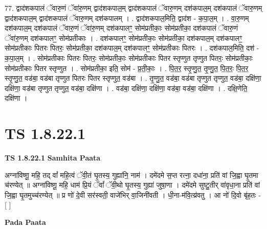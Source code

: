\documentclass[17pt]{extarticle}
\begin{document}
77. द्वाद॑शकपालं ॅवारु॒णं ॅवा॑रु॒णम् द्वाद॑शकपाल॒म् द्वाद॑शकपालं ॅवारु॒णम् दश॑कपाल॒म् दश॑कपालं ॅवारु॒णम् द्वाद॑शकपाल॒म् द्वाद॑शकपालं ॅवारु॒णम् दश॑कपालम् । . द्वाद॑शकपाल॒मिति॒ द्वाद॑श - क॒पा॒ल॒म् । . वा॒रु॒णम् दश॑कपाल॒म् दश॑कपालं ॅवारु॒णं ॅवा॑रु॒णम् दश॑कपालꣳ॒॒ सोम॑प्रतीकाः॒ सोम॑प्रतीका॒ दश॑कपालं ॅवारु॒णं ॅवा॑रु॒णम् दश॑कपालꣳ॒॒ सोम॑प्रतीकाः । . दश॑कपालꣳ॒॒ सोम॑प्रतीकाः॒ सोम॑प्रतीका॒ दश॑कपाल॒म् दश॑कपालꣳ॒॒ सोम॑प्रतीकाः पितरः पितरः॒ सोम॑प्रतीका॒ दश॑कपाल॒म् दश॑कपालꣳ॒॒ सोम॑प्रतीकाः पितरः । . दश॑कपाल॒मिति॒ दश॑ - क॒पा॒ल॒म् । . सोम॑प्रतीकाः पितरः पितरः॒ सोम॑प्रतीकाः॒ सोम॑प्रतीकाः पितर स्तृप्णुत तृप्णुत पितरः॒ सोम॑प्रतीकाः॒ सोम॑प्रतीकाः पितर स्तृप्णुत । . सोम॑प्रतीका॒ इति॒ सोम॑ - प्र॒ती॒काः॒ । . पि॒त॒र॒ स्तृ॒प्णु॒त॒ तृ॒प्णु॒त॒ पि॒त॒रः॒ पि॒त॒र॒ स्तृ॒प्णु॒त॒ वड॑बा॒ वड॑बा तृप्णुत पितरः पितर स्तृप्णुत॒ वड॑बा । . तृ॒प्णु॒त॒ वड॑बा॒ वड॑बा तृप्णुत तृप्णुत॒ वड॑बा॒ दक्षि॑णा॒ दक्षि॑णा॒ वड॑बा तृप्णुत तृप्णुत॒ वड॑बा॒ दक्षि॑णा । . वड॑बा॒ दक्षि॑णा॒ दक्षि॑णा॒ वड॑बा॒ वड॑बा॒ दक्षि॑णा । . दक्षि॒णेति॒ दक्षि॑णा । \newline
\pagebreak
{}

\section{ TS 1.8.22.1 }

\textbf{TS 1.8.22.1 } \newline
\textbf{Samhita Paata} \newline

अग्ना॑विष्णू॒ महि॒ तद् वां᳚ महि॒त्वं ॅवी॒तं घृ॒तस्य॒ गुह्या॑नि॒ नाम॑ । दमे॑दमे स॒प्त रत्ना॒ दधा॑ना॒ प्रति॑ वां जि॒ह्वा घृ॒तमा च॑रण्येत् ॥ अग्ना॑विष्णू॒ महि॒ धाम॑ प्रि॒यं ॅवां᳚ ॅवी॒थो घृ॒तस्य॒ गुह्या॑ जुषा॒णा । दमे॑दमे सुष्टु॒तीर् वा॑वृधा॒ना प्रति॑ वां जि॒ह्वा घृ॒तमुच्च॑रण्येत् ॥ प्र णो॑ दे॒वी सर॑स्वती॒ वाजे॑भिर् वा॒जिनी॑वती । धी॒ना-म॑वि॒त्य्र॑वतु । आ नो॑ दि॒वो बृ॑ह॒तः - [ ] \newline

\textbf{Pada Paata} \newline
\end{document}
